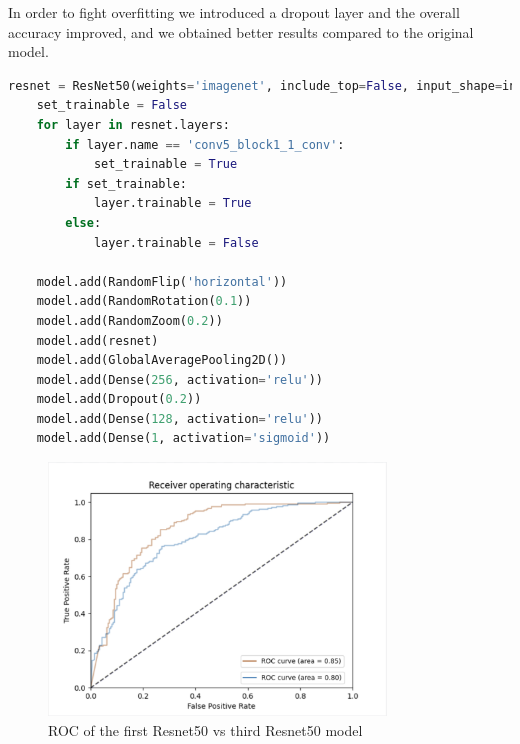 In order to fight overfitting we introduced a dropout layer and the overall accuracy improved, and we obtained better results compared to the original model. 

\begin{lstlisting}[language=python, caption={ResNet50 Third test}, label={lst:resnet50CodeThirdTest}]
    resnet = ResNet50(weights='imagenet', include_top=False, input_shape=input_shape)
    set_trainable = False
    for layer in resnet.layers:
        if layer.name == 'conv5_block1_1_conv':
            set_trainable = True
        if set_trainable:
            layer.trainable = True
        else:
            layer.trainable = False

    model.add(RandomFlip('horizontal'))
    model.add(RandomRotation(0.1))
    model.add(RandomZoom(0.2))
    model.add(resnet)
    model.add(GlobalAveragePooling2D())
    model.add(Dense(256, activation='relu'))
    model.add(Dropout(0.2))
    model.add(Dense(128, activation='relu'))
    model.add(Dense(1, activation='sigmoid'))
\end{lstlisting}

\begin{figure}[h!]
    \centering
    \includegraphics[width=0.8\textwidth]{images/ROCResnet.png}
    \caption{ROC of the first Resnet50 vs third Resnet50 model}
    \label{fig:ROCResnet}
\end{figure}



